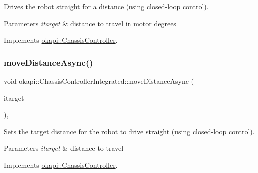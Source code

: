Drives the robot straight for a distance (using closed-\/loop control).


\begin{DoxyCode}{0}
\DoxyCodeLine{\textcolor{comment}{// Drive forward by spinning the motors 400 degrees}}
\end{DoxyCode}



\begin{DoxyParams}{Parameters}
{\em itarget} & distance to travel in motor degrees \\
\hline
\end{DoxyParams}


Implements \mbox{\hyperlink{classokapi_1_1ChassisController_a58619e777fd1b3f8e1aae871d46a8ccf}{okapi\+::\+Chassis\+Controller}}.

\mbox{\label{classokapi_1_1ChassisControllerIntegrated_afc97bc450a090d91b57bc6353b4a6972}} 
\subsubsection{\texorpdfstring{moveDistanceAsync()}{moveDistanceAsync()}\hspace{0.1cm}{\footnotesize\ttfamily [1/2]}}
{\footnotesize\ttfamily void okapi\+::\+Chassis\+Controller\+Integrated\+::move\+Distance\+Async (\begin{DoxyParamCaption}\item[{Q\+Length}]{itarget }\end{DoxyParamCaption})\hspace{0.3cm}{\ttfamily [override]}, {\ttfamily [virtual]}}

Sets the target distance for the robot to drive straight (using closed-\/loop control).


\begin{DoxyParams}{Parameters}
{\em itarget} & distance to travel \\
\hline
\end{DoxyParams}


Implements \mbox{\hyperlink{classokapi_1_1ChassisController_a67a17268b871a4f1ae74d67891cbf5dd}{okapi\+::\+Chassis\+Controller}}.

